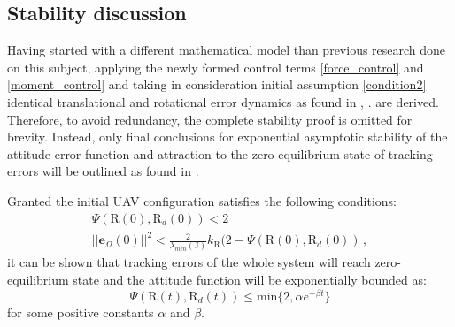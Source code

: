 \subsection{Stability discussion}

Having started with a different mathematical model than previous research done on this subject, applying the newly formed control terms \ref{force_control} and \ref{moment_control} and taking in consideration initial assumption \ref{condition2} identical translational and rotational error dynamics as found in \cite{LeeClanak1}, \cite{LeeClanak4}. are derived.\\
Therefore, to avoid redundancy, the complete stability proof is omitted for brevity. Instead, only final conclusions for exponential asymptotic stability of the attitude error function and attraction to the zero-equilibrium state of tracking errors will be outlined as found in \cite{LeeClanak1}.

Granted the initial UAV configuration satisfies the following conditions:
\begin{gather}
	\Psi (\text{R}(0), \text{R}_d(0)) < 2 \\
	||\textbf{e}_\Omega(0)||^2 < \frac{2}{\lambda_{min}(\text{J})}k_\text{R}(2 - \Psi(\text{R}(0), \text{R}_d(0)) \, ,
\end{gather}
it can be shown that tracking errors of the whole system will reach zero-equilibrium state and the attitude function will be exponentially bounded as:
\begin{equation}
	\Psi(\text{R}(t), \text{R}_d(t)) \leq \text{min}\{2, \alpha e^{-\beta t} \}
\end{equation}
for some positive constants $\alpha$ and $\beta$.